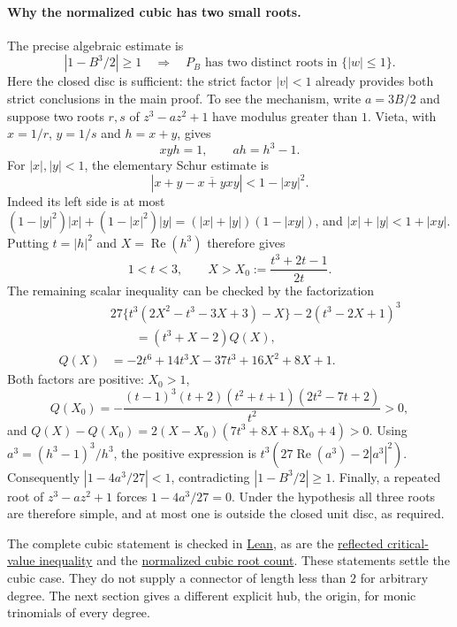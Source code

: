 \documentclass[11pt]{article}
\begin{document}
\paragraph{Why the normalized cubic has two small roots.}
The precise algebraic estimate is
\[
 |1-B^3/2|\ge1
 \quad\Longrightarrow\quad
 P_B\text{ has two distinct roots in }\{|w|\le1\}.
\]
Here the closed disc is sufficient: the strict factor $|v|<1$ already
provides both strict conclusions in the main proof.
To see the mechanism, write $a=3B/2$ and suppose two roots $r,s$ of
$z^3-az^2+1$ have modulus greater than $1$.  Vieta, with
$x=1/r$, $y=1/s$ and $h=x+y$, gives
\[
 xyh=1,\qquad ah=h^3-1.
\]
For $|x|,|y|<1$, the elementary Schur estimate is
\[
 |x+y-\overline{x+y}xy|<1-|xy|^2.
\]
Indeed its left side is at most
$(1-|y|^2)|x|+(1-|x|^2)|y|
=(|x|+|y|)(1-|xy|)$, and
$|x|+|y|<1+|xy|$.
Putting $t=|h|^2$ and $X=\operatorname{Re}(h^3)$ therefore gives
\[
 1<t<3,\qquad X>X_0:=\frac{t^3+2t-1}{2t}.
\]
The remaining scalar inequality can be checked by the factorization
\begin{align*}
 &27\{t^3(2X^2-t^3-3X+3)-X\}-2(t^3-2X+1)^3\\
 &\qquad=(t^3+X-2)Q(X),\\
 Q(X)&=-2t^6+14t^3X-37t^3+16X^2+8X+1.
\end{align*}
Both factors are positive: $X_0>1$,
\[
 Q(X_0)=-\frac{(t-1)^3(t+2)(t^2+t+1)(2t^2-7t+2)}{t^2}>0,
\]
and
$Q(X)-Q(X_0)=2(X-X_0)(7t^3+8X+8X_0+4)>0$.
Using $a^3=(h^3-1)^3/h^3$, the positive expression is
$t^3(27\operatorname{Re}(a^3)-2|a^3|^2)$.
Consequently $|1-4a^3/27|<1$, contradicting $|1-B^3/2|\ge1$.
Finally, a repeated root of $z^3-az^2+1$ forces $1-4a^3/27=0$.
Under the hypothesis all three roots are therefore simple, and at most one
is outside the closed unit disc, as required.

The complete cubic statement is checked in
\href{https://github.com/wcook04/plectis-erdos/blob/bb4e24651b37cd096d3749ef299c3317930b3a3b/ErdosProblems/Erdos1041/PaperCubicCompletion.lean#L297}{Lean},
as are the
\href{https://github.com/wcook04/plectis-erdos/blob/bb4e24651b37cd096d3749ef299c3317930b3a3b/ErdosProblems/Erdos1041/PaperReflectedCompletion.lean#L254}{reflected critical-value inequality}
and the
\href{https://github.com/wcook04/plectis-erdos/blob/bb4e24651b37cd096d3749ef299c3317930b3a3b/ErdosProblems/Erdos1041/PaperCubicSchur.lean#L283}{normalized cubic root count}.
These statements settle the cubic case.  They do not supply a connector of
length less than $2$ for arbitrary degree.  The next section gives a different
explicit hub, the origin, for monic trinomials of every degree.
\end{document}
